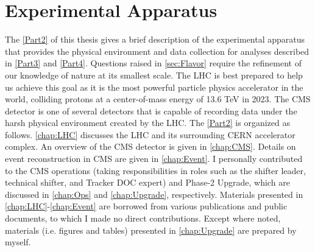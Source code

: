 \part{Experimental Apparatus}
\label{Part2}
The \autoref{Part2} of this thesis gives a brief description of the experimental apparatus that provides the physical environment and data collection for analyses described in \autoref{Part3} and \autoref{Part4}. Questions raised in \autoref{sec:Flavor} require the refinement of our knowledge of nature at its smallest scale. The \ac{LHC} is best prepared to help us achieve this goal as it is the most powerful particle physics accelerator in the world, colliding protons at a center-of-mass energy of 13.6 TeV in 2023. The \ac{CMS} detector is one of several detectors that is capable of recording data under the harsh physical environment created by the \ac{LHC}. The \autoref{Part2} is organized as follows. \autoref{chap:LHC} discusses the \ac{LHC} and its surrounding \ac{CERN} accelerator complex. An overview of the \ac{CMS} detector is given in \autoref{chap:CMS}. Details on event reconstruction in \ac{CMS} are given in \autoref{chap:Event}. I personally contributed to the \ac{CMS} operations (taking responsibilities in roles such as the shifter leader, technical shifter, and Tracker \ac{DOC} expert) and Phase-2 Upgrade, which are discussed in \autoref{chap:Ops} and \autoref{chap:Upgrade}, respectively. Materials presented in \autoref{chap:LHC}-\autoref{chap:Event} are borrowed from various publications and public documents, to which I made no direct contributions. Except where noted, materials (i.e. figures and tables) presented in \autoref{chap:Upgrade} are prepared by myself.





